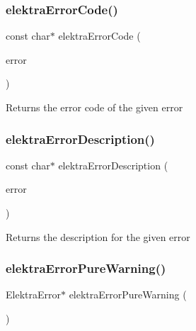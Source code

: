 \subsubsection{\texorpdfstring{elektra\+Error\+Code()}{elektraErrorCode()}}
{\footnotesize\ttfamily const char$\ast$ elektra\+Error\+Code (\begin{DoxyParamCaption}\item[{const Elektra\+Error $\ast$}]{error }\end{DoxyParamCaption})}

\begin{DoxyReturn}{Returns}
the error code of the given error 
\end{DoxyReturn}
\mbox{\label{group__highlevel_ga781cda83af3981a55321e7c613afbef0}} 
\subsubsection{\texorpdfstring{elektra\+Error\+Description()}{elektraErrorDescription()}}
{\footnotesize\ttfamily const char$\ast$ elektra\+Error\+Description (\begin{DoxyParamCaption}\item[{const Elektra\+Error $\ast$}]{error }\end{DoxyParamCaption})}

\begin{DoxyReturn}{Returns}
the description for the given error 
\end{DoxyReturn}
\mbox{\label{group__highlevel_ga4895fb4c40822a11219846b189395db0}} 
\subsubsection{\texorpdfstring{elektra\+Error\+Pure\+Warning()}{elektraErrorPureWarning()}}
{\footnotesize\ttfamily Elektra\+Error$\ast$ elektra\+Error\+Pure\+Warning (\begin{DoxyParamCaption}\item[{void}]{ }\end{DoxyParamCaption})}




